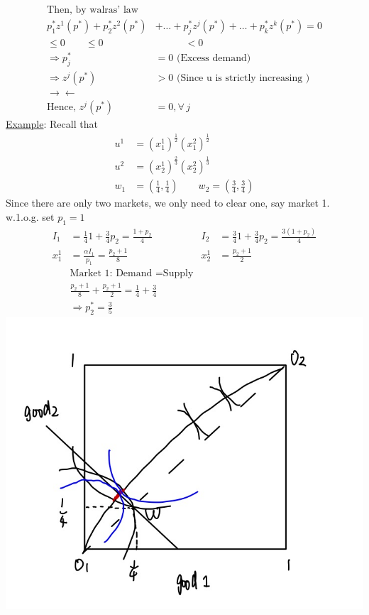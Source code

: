 \documentclass[letterpaper,13pt,single,pdftex]{scrartcl}
\begin{document}
 \begin{align*}
    \text{Then, by walras' law}&\\
   p_1^*z^1(p^*) + p_2^*z^2(p^*)& +\dots+p_j^*z^j(p^*) +\dots+p_k^*z^k(p^*)  = 0\\
   \le 0\qquad \le 0\quad & \qquad \quad <0 \\
   \Rightarrow p_j^* &= 0 \text{  (Excess demand)}\\
   \Rightarrow z^j(p^*) &>0 \text{  (Since u is strictly increasing )}\\
   \rightarrow\leftarrow\\
   \text{Hence, } z^j(p^*) &= 0, \forall \,j
 \end{align*}
 \underline{Example}: Recall that  \begin{align*}
    u^1 &= (x_1^1)^{\frac{1}{2}}(x_1^2)^{\frac{1}{2}}\\
    u^2 &= (x_2^1)^{\frac{2}{3}}(x_2^2)^{\frac{1}{3}}\\
    w_1 &= (\frac{1}{4},\frac{1}{4}) \qquad w_2 = (\frac{3}{4},\frac{3}{4})
\end{align*}
 Since there are only two markets, we only need to clear one, say market 1. w.1.o.g. set $p_1=1$
\begin{align*}
     I_1 &= \frac{1}{4}1+\frac{3}{4}p_2 = \frac{1+p_2}{4} &
     I_2 &= \frac{3}{4}1+\frac{3}{4}p_2 = \frac{3(1+p_2)}{4}\\
     x_1^1&=\frac{\alpha I_1}{p_1} = \frac{p_2+1}{8} &x_2^1&=\frac{p_2+1}{2}\\
&\text{Market 1: }\text{Demand }= \text{Supply}&\\
&\frac{p_2+1}{8}+\frac{p_2+1}{2} = \frac{1}{4}+\frac{3}{4}\\
&\Rightarrow p_2^*= \frac{3}{5}
 \end{align*}
\includegraphics[scale = 0.2]{WEA-1.jpg}\\
\end{document}
